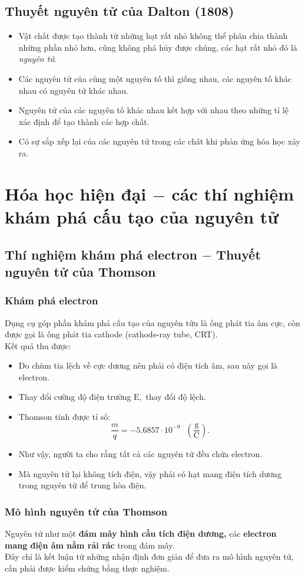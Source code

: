 \subsection{Thuyết nguyên tử của Dalton (1808)}
\begin{itemize}
\item Vật chất được tạo thành từ những hạt rất nhỏ không thể phân chia thành những phần nhỏ hơn, cũng không phá hủy được chúng, các hạt rất nhỏ đó là \textit{nguyên tử.}
\item Các nguyên tử của cùng một nguyên tố thì giống nhau, các nguyên tố khác nhau có nguyên tử khác nhau.
\item Nguyên tử của các nguyên tố khác nhau kết hợp với nhau theo những tỉ lệ xác định để tạo thành các hợp chất.
\item Có sự sắp xếp lại của các nguyên tử trong các chât khi phản ứng hóa học xảy ra.
\end{itemize}
\section{Hóa học hiện đại $-$ các thí nghiệm khám phá cấu tạo của nguyên tử}
\subsection{Thí nghiệm khám phá electron $-$ Thuyết nguyên tử của Thomson}
\subsubsection{Khám phá electron}
Dụng cụ góp phần khám phá cấu tạo của nguyên tửu là ống phát tia âm cực, còn được gọi là ống phát tia cathode (cathode-ray tube, CRT).\\
Kết quả thu được:
\begin{itemize}
\item Do chùm tia lệch về cực dương nên phải có điện tích âm, sau này gọi là electron.
\item Thay đổi cường độ điện trường $\mathrm{E},$ thay đổi độ lệch.
\item Thomson tính được tỉ số:
$$\frac{m}{q} = -5.6857 \cdot 10^{-9} \text{ } \left( {\mathrm{\frac{g}{C}}} \right).$$
\item Như vậy, người ta cho rằng tất cả các nguyên tử đều chứa electron.
\item Mà nguyên tử lại không tích điện, vậy phải có hạt mang điện tích dương trong nguyên tử để trung hòa điện.
\end{itemize}
\subsubsection{Mô hình nguyên tử của Thomson}
Nguyên tử như một \textbf{đám mây hình cầu tích điện dương,} các \textbf{electron mang điện âm nằm rải rác} trong đám mây.\\
Đây chỉ là kết luận từ những nhận định đơn giản để đưa ra mô hình nguyên tử, cần phải được kiểm chứng bằng thực nghiệm.
